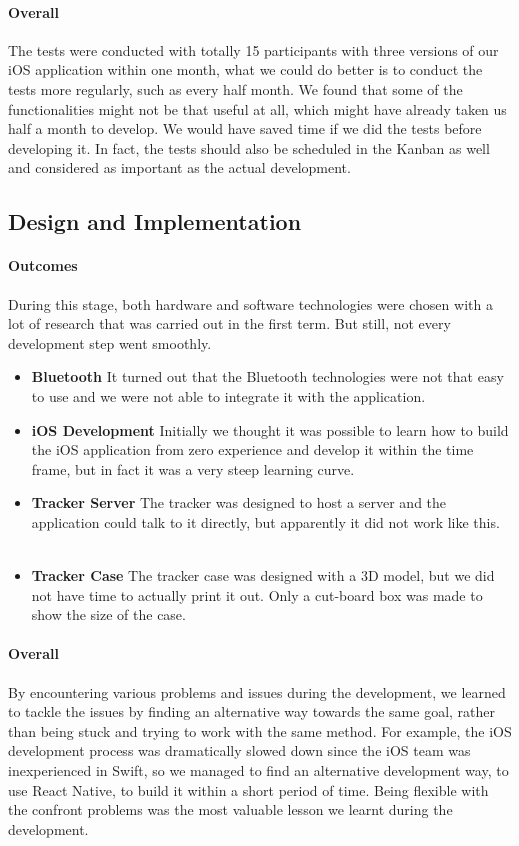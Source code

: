 \documentclass[12pt,a4paper]{article}
\begin{document}
        \paragraph{Overall} The tests were conducted with totally 15 participants with three versions of our iOS application within one month, what we could do better is to conduct the tests more regularly, such as every half month. We found that some of the functionalities might not be that useful at all, which might have already taken us half a month to develop. We would have saved time if we did the tests before developing it. In fact, the tests should also be scheduled in the Kanban as well and considered as important as the actual development.

      \subsection{Design and Implementation}
        \paragraph{Outcomes} During this stage, both hardware and software technologies were chosen with a lot of research that was carried out in the first term. But still, not every development step went smoothly. 
        \begin{itemize}
          \item {\bf Bluetooth} It turned out that the Bluetooth technologies were not that easy to use and we were not able to integrate it with the application. 
          \item {\bf iOS Development} Initially we thought it was possible to learn how to build the iOS application from zero experience and develop it within the time frame, but in fact it was a very steep learning curve.
          \item {\bf Tracker Server} The tracker was designed to host a server and the application could talk to it directly, but apparently it did not work like this.
          \item {\bf Tracker Case} The tracker case was designed with a 3D model, but we did not have time to actually print it out. Only a cut-board box was made to show the size of the case.
        \end{itemize}

        \paragraph{Overall} By encountering various problems and issues during the development, we learned to tackle the issues by finding an alternative way towards the same goal, rather than being stuck and trying to work with the same method. For example, the iOS development process was dramatically slowed down since the iOS team was inexperienced in Swift, so we managed to find an alternative development way, to use React Native, to build it within a short period of time. Being flexible with the confront problems was the most valuable lesson we learnt during the development. 
        
\end{document}
